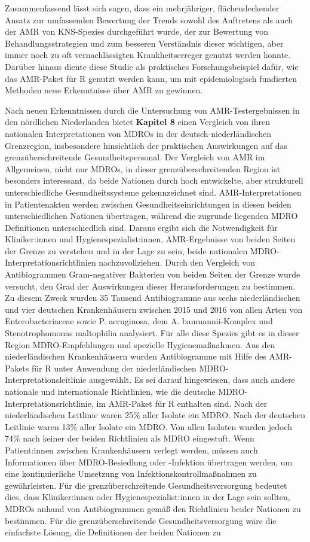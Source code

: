 \documentclass[
]{book}
\begin{document}
Zusammenfassend lässt sich sagen, dass ein mehrjähriger, flächendeckender Ansatz zur umfassenden Bewertung der Trends sowohl des Auftretens als auch der AMR von KNS-Spezies durchgeführt wurde, der zur Bewertung von Behandlungsstrategien und zum besseren Verständnis dieser wichtigen, aber immer noch zu oft vernachlässigten Krankheitserreger genutzt werden konnte. Darüber hinaus diente diese Studie als praktisches Forschungsbeispiel dafür, wie das AMR-Paket für R genutzt werden kann, um mit epidemiologisch fundierten Methoden neue Erkenntnisse über AMR zu gewinnen.

Nach neuen Erkenntnissen durch die Untersuchung von AMR-Testergebnissen in den nördlichen Niederlanden bietet \textbf{Kapitel 8} einen Vergleich von ihren nationalen Interpretationen von MDROs in der deutsch-niederländischen Grenzregion, insbesondere hinsichtlich der praktischen Auswirkungen auf das grenzüberschreitende Gesundheitspersonal. Der Vergleich von AMR im Allgemeinen, nicht nur MDROs, in dieser grenzüberschreitenden Region ist besonders interessant, da beide Nationen durch hoch entwickelte, aber strukturell unterschiedliche Gesundheitssysteme gekennzeichnet sind. AMR-Interpretationen in Patientenakten werden zwischen Gesundheitseinrichtungen in diesen beiden unterschiedlichen Nationen übertragen, während die zugrunde liegenden MDRO Definitionen unterschiedlich sind. Daraus ergibt sich die Notwendigkeit für Kliniker:innen und Hygienespezialist:innen, AMR-Ergebnisse von beiden Seiten der Grenze zu verstehen und in der Lage zu sein, beide nationalen MDRO-Interpretationsrichtlinien nachzuvollziehen. Durch den Vergleich von Antibiogrammen Gram-negativer Bakterien von beiden Seiten der Grenze wurde versucht, den Grad der Auswirkungen dieser Herausforderungen zu bestimmen. Zu diesem Zweck wurden 35 Tausend Antibiogramme aus sechs niederländischen und vier deutschen Krankenhäusern zwischen 2015 und 2016 von allen Arten von Enterobacteriaceae sowie P. aeruginosa, dem A. baumannii-Komplex und Stenotrophomonas maltophilia analysiert. Für alle diese Spezies gibt es in dieser Region MDRO-Empfehlungen und spezielle Hygienemaßnahmen. Aus den niederländischen Krankenhäusern wurden Antibiogramme mit Hilfe des AMR-Pakets für R unter Anwendung der niederländischen MDRO-Interpretationsleitlinie ausgewählt. Es sei darauf hingewiesen, dass auch andere nationale und internationale Richtlinien, wie die deutsche MDRO-Interpretationsrichtlinie, im AMR-Paket für R enthalten sind. Nach der niederländischen Leitlinie waren 25\% aller Isolate ein MDRO. Nach der deutschen Leitlinie waren 13\% aller Isolate ein MDRO. Von allen Isolaten wurden jedoch 74\% nach keiner der beiden Richtlinien als MDRO eingestuft. Wenn Patient:innen zwischen Krankenhäusern verlegt werden, müssen auch Informationen über MDRO-Besiedlung oder -Infektion übertragen werden, um eine kontinuierliche Umsetzung von Infektionskontrollmaßnahmen zu gewährleisten. Für die grenzüberschreitende Gesundheitsversorgung bedeutet dies, dass Kliniker:innen oder Hygienespezialist:innen in der Lage sein sollten, MDROs anhand von Antibiogrammen gemäß den Richtlinien beider Nationen zu bestimmen. Für die grenzüberschreitende Gesundheitsversorgung wäre die einfachste Lösung, die Definitionen der beiden Nationen zu 
\end{document}

